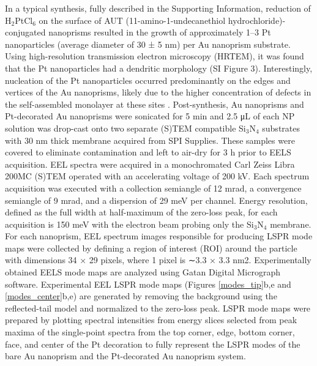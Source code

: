 \documentclass [11pt, proquest] {uwthesis}[2016/11/22]
\begin{document}
In a typical synthesis, fully described in the Supporting Information, reduction of H$_2$PtCl$_6$ on the surface of AUT (11-amino-1-undecanethiol hydrochloride)-conjugated nanoprisms resulted in the growth of approximately 1–3 Pt nanoparticles (average diameter of 30 ± 5 nm) per Au nanoprism substrate. Using high-resolution transmission electron microscopy (HRTEM), it was found that the Pt nanoparticles had a dendritic morphology (SI Figure 3). Interestingly, nucleation of the Pt nanoparticles occurred predominantly on the edges and vertices of the Au nanoprisms, likely due to the higher concentration of defects in the self-assembled monolayer at these sites \cite{salvarezza}.
Post-synthesis, Au nanoprisms and Pt-decorated Au nanoprisms were sonicated for 5 min and 2.5 μL of each NP solution was drop-cast onto two separate (S)TEM compatible Si$_3$N$_4$ substrates with 30 nm thick membrane acquired from SPI Supplies. These samples were covered to eliminate contamination and left to air-dry for 3 h prior to EELS acquisition. EEL spectra were acquired in a monochromated Carl Zeiss Libra 200MC (S)TEM operated with an accelerating voltage of 200 kV. Each spectrum acquisition was executed with a collection semiangle of 12 mrad, a convergence semiangle of 9 mrad, and a dispersion of 29 meV per channel. Energy resolution, defined as the full width at half-maximum of the zero-loss peak, for each acquisition is 150 meV with the electron beam probing only the Si$_3$N$_4$ membrane. For each nanoprism, EEL spectrum images responsible for producing LSPR mode maps were collected by defining a region of interest (ROI) around the particle with dimensions 34 × 29 pixels, where 1 pixel is ∼3.3 × 3.3 nm2.
Experimentally obtained EELS mode maps are analyzed using Gatan Digital Micrograph software. Experimental EEL LSPR mode maps (Figures \ref{modes_tip}b,e and \ref{modes_center}b,e) are generated by removing the background using the reflected-tail model and normalized to the zero-loss peak. LSPR mode maps were prepared by plotting spectral intensities from energy slices selected from peak maxima of the single-point spectra from the top corner, edge, bottom corner, face, and center of the Pt decoration to fully represent the LSPR modes of the bare Au nanoprism and the Pt-decorated Au nanoprism system.
\end{document}
